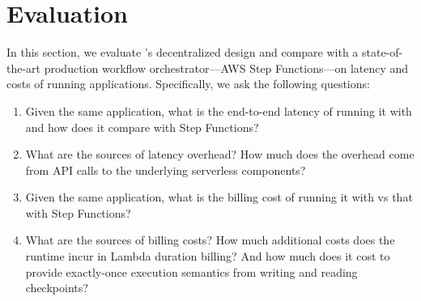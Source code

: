 \section{Evaluation}\label{sec:eval}

In this section, we evaluate \name{}'s decentralized design and compare
with a state-of-the-art production workflow orchestrator---AWS Step
Functions---on latency and costs of running applications. Specifically, we ask
the following questions:

\begin{enumerate}

  \item Given the same application, what is the end-to-end latency of
    running it with \name{} and how does it compare with Step Functions?

  \item What are the sources of  latency overhead? How much does
    the overhead come from API calls to the underlying serverless components?

  \item Given the same application, what is the billing cost of running it
  with \name{} vs that with Step Functions?

  \item What are the sources of  billing costs? How much additional
  costs does the \name{} runtime incur in Lambda duration billing? And how
  much does it cost to provide exactly-once execution semantics from writing
  and reading checkpoints?

\end{enumerate}






